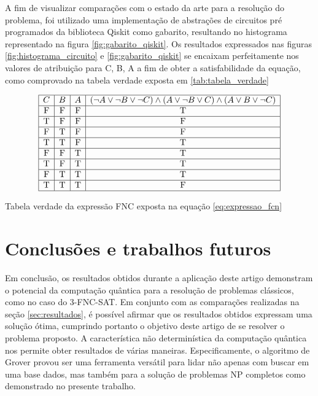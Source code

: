 \documentclass[12pt]{article}
\begin{document}
A fim de visualizar comparações com o estado da arte para a resolução do problema, foi utilizado uma implementação de abstrações de circuitos pré programados da biblioteca Qiskit como gabarito, resultando no histograma representado na figura \ref{fig:gabarito_qiskit}. Os resultados expressados nas figuras  \ref{fig:histograma_circuito} e \ref{fig:gabarito_qiskit} se encaixam perfeitamente nos valores de atribuição para C, B, A a fim de obter a satisfabilidade da equação, como comprovado na tabela verdade exposta em \ref{tab:tabela_verdade}
\begin{table}[h!]
\centering
\[
\begin{array}{|c|c|c|c|}
\hline
C & B & A & (\neg A \lor \neg B \lor \neg C) \land (A \lor \neg B \lor C) \land (A \lor B \lor \neg C) \\
\hline
\text{F} & \text{F} & \text{F} & \text{T} \\
\hline
\text{T} & \text{F} & \text{F} & \text{F} \\
\hline
\text{F} & \text{T} & \text{F} & \text{F} \\
\hline
\text{T} & \text{T} & \text{F} & \text{T} \\
\hline
\text{F} & \text{F} & \text{T} & \text{T} \\
\hline
\text{T} & \text{F} & \text{T} & \text{T} \\
\hline
\text{F} & \text{T} & \text{T} & \text{T} \\
\hline
\text{T} & \text{T} & \text{T} & \text{F} \\
\hline
\end{array}
\]
\caption{Tabela verdade da expressão FNC exposta na equação \ref{eq:expressao_fcn}}
\label{tab:tabela_verdade}
\end{table}

\section{Conclusões e trabalhos futuros}\label{sec:conclusoes}


Em conclusão, os resultados obtidos durante a aplicação deste artigo demonstram o potencial da computação quântica para a resolução de problemas clássicos, como no caso do 3-FNC-SAT. Em conjunto com as comparações realizadas na seção \ref{sec:resultados}, é possível afirmar que os resultados obtidos expressam uma solução ótima, cumprindo portanto o objetivo deste artigo de se resolver o problema proposto. 
A característica não determinística da computação quântica nos permite obter resultados de várias maneiras. Especificamente, o algoritmo de Grover provou ser uma ferramenta versátil para lidar não apenas com buscar em uma base dados, mas também para a solução de problemas NP completos como demonstrado no presente trabalho.
\end{document}
